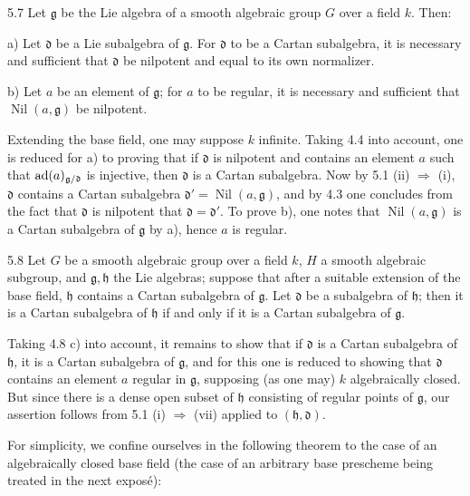 \begin{corollary}{5.7}\label{XIII.5.7}
Let $\mathfrak g$ be the Lie algebra of a smooth algebraic group
$G$ over a field $k$. Then:

\noindent a) Let $\mathfrak d$ be a Lie subalgebra of $\mathfrak g$.
For $\mathfrak d$ to be a Cartan subalgebra, it is necessary and
sufficient that $\mathfrak d$ be nilpotent and equal to its own
normalizer.

\noindent b) Let $a$ be an element of $\mathfrak g$; for $a$ to
be regular, it is necessary and sufficient that
$\operatorname{Nil}(a,\mathfrak g)$ be nilpotent.
\end{corollary}
Extending the base field, one may suppose $k$ infinite. Taking
4.4 into account, one is reduced for a) to proving that if
$\mathfrak d$ is nilpotent and contains an element $a$ such that
$\operatorname{ad}(a)_{\mathfrak g/\mathfrak d}$ is injective, then
$\mathfrak d$ is a Cartan subalgebra. Now by 5.1 (ii)
$\Rightarrow$ (i), $\mathfrak d$ contains a Cartan subalgebra
$\mathfrak d'=\operatorname{Nil}(a,\mathfrak g)$, and by 4.3 one
concludes from the fact that $\mathfrak d$ is nilpotent that
$\mathfrak d=\mathfrak d'$. To prove b), one notes that
$\operatorname{Nil}(a,\mathfrak g)$ is a Cartan subalgebra of
$\mathfrak g$ by a), hence $a$ is regular.

\begin{corollary}{5.8}\label{XIII.5.8}
Let $G$ be a smooth algebraic group over a field $k$, $H$ a smooth
algebraic subgroup, and $\mathfrak g,\mathfrak h$ the Lie algebras;
suppose that after a suitable extension of the base field,
$\mathfrak h$ contains a Cartan subalgebra of $\mathfrak g$.
Let $\mathfrak d$ be a subalgebra of $\mathfrak h$; then it is
a Cartan subalgebra of $\mathfrak h$ if and only if it is a
Cartan subalgebra of $\mathfrak g$.
\end{corollary}
Taking 4.8 c) into account, it remains to show that if
$\mathfrak d$ is a Cartan subalgebra of $\mathfrak h$, it is a
Cartan subalgebra of $\mathfrak g$, and for this one is reduced
to showing that $\mathfrak d$ contains an element $a$ regular
in $\mathfrak g$, supposing (as one may) $k$ algebraically
closed. But since there is a dense open subset of
$\mathfrak h$ consisting of regular points of $\mathfrak g$,
our assertion follows from 5.1 (i) $\Rightarrow$ (vii) applied
to $(\mathfrak h,\mathfrak d)$.

For simplicity, we confine ourselves in the following theorem
to the case of an algebraically closed base field (the case of
an arbitrary base prescheme being treated in the next expos\'e):

